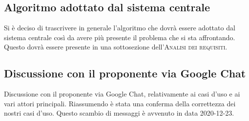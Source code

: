 \subsection{Algoritmo adottato dal sistema centrale}
Si è deciso di trascrivere in generale l'algoritmo che dovrà essere adottato dal sistema centrale così da avere più presente il problema che si sta affrontando. Questo dovrà essere presente in una sottosezione dell'\textsc{Analisi dei requisiti}. 

\subsection{Discussione con il proponente via Google Chat}
Discussione con il proponente via Google Chat, relativamente ai casi d'uso e ai vari attori principali.
Riassumendo è  stata una conferma della correttezza dei nostri casi d'uso.
Questo scambio di messaggi è avvenuto in data 2020-12-23.